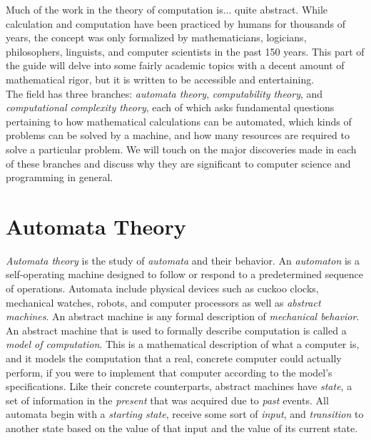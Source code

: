 Much of the work in the theory of computation is$\dots$ quite abstract. While calculation and computation have been practiced by humans for thousands of years, the concept was only formalized by mathematicians, logicians, philosophers, linguists, and computer scientists in the past 150 years. This part of the guide will delve into some fairly academic topics with a decent amount of mathematical rigor, but it is written to be accessible and entertaining. \\

The field has three branches: \textit{automata theory}, \textit{computability theory}, and \textit{computational complexity theory}, each of which asks fundamental questions pertaining to how mathematical calculations can be automated, which kinds of problems can be solved by a machine, and how many resources are required to solve a particular problem. We will touch on the major discoveries made in each of these branches and discuss why they are significant to computer science and programming in general. \\



\toclineskip
\section{Automata Theory}


\textit{Automata theory} is the study of \textit{automata} and their behavior. An \textit{automaton} is a self-operating machine designed to follow or respond to a predetermined sequence of operations. Automata include physical devices such as cuckoo clocks, mechanical watches, robots, and computer processors as well as \textit{abstract machines}. An abstract machine is any formal description of \textit{mechanical behavior}. An abstract machine that is used to formally describe computation is called a \textit{model of computation}. This is a mathematical description of what a computer is, and it models the computation that a real, concrete computer could actually perform, if you were to implement that computer according to the model's specifications. Like their concrete counterparts, abstract machines have \textit{state}, a set of information in the \textit{present} that was acquired due to \textit{past} events. All automata begin with a \textit{starting state}, receive some sort of \textit{input}, and \textit{transition} to another state based on the value of that input and the value of its current state. \\

